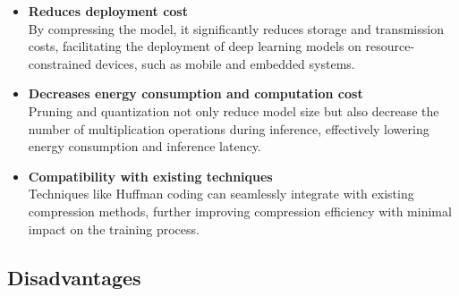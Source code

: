 \documentclass[12pt]{article}
\begin{document}
\begin{itemize}
    \item \textbf{Reduces deployment cost}\\
    By compressing the model, it significantly reduces storage and transmission costs, facilitating the deployment of deep learning models on resource-constrained devices, such as mobile and embedded systems.

    \item \textbf{Decreases energy consumption and computation cost}\\
    Pruning and quantization not only reduce model size but also decrease the number of multiplication operations during inference, effectively lowering energy consumption and inference latency.

    \item \textbf{Compatibility with existing techniques}\\
    Techniques like Huffman coding can seamlessly integrate with existing compression methods, further improving compression efficiency with minimal impact on the training process.
\end{itemize}

\subsection{Disadvantages}
\end{document}
